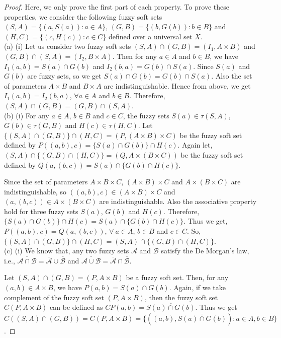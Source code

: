 \documentclass{article}
\theoremstyle{definition}
\begin{document}
\begin{proof}

 Here, we only prove the first part of each property. To prove these properties, we consider the following fuzzy soft sets $(S,A)=\{(a, S(a)): a\in A\}$, $(G,B)=\{(b, G(b)): b\in B\}$ and  $(H,C)=\{(c, H(c)): c\in C\}$ defined over a universal set $X$.\\

(a) (i) Let us consider two fuzzy soft sets $(S,A) \cap (G,B)=(I_1, A\times B)$ and $(G,B) \cap (S,A)=(I_2, B\times A)$. Then for any $a\in A$ and $b\in B$, we have $I_1(a,b)=S(a) \cap G(b)$ and $I_2(b,a)=G(b) \cap S(a)$. Since $S(a)$ and $G(b)$ are fuzzy sets, so we get $S(a) \cap G(b)=G(b) \cap S(a)$. Also the set of parameters $A\times B$ and $B\times A$ are indistinguishable. Hence from above, we get $I_1(a,b)= I_2(b,a)$, $\forall a \in A $ and $b\in B$. Therefore, $(S,A) \cap (G,B) = (G,B) \cap (S,A)$.\\


(b) (i) For any $a\in A$, $b\in B$ and $c\in C$, the fuzzy sets $S(a)\in \tau (S,A)$, $G(b)\in \tau (G,B)$ and $H(c)\in \tau (H,C)$. Let $\{(S,A) \cap (G,B)\}\cap (H,C)= (P, (A\times B)\times C)$ be the fuzzy soft set defined by $P((a,b),c)= \{S(a)\cap G(b)\}\cap H(c)$. Again let, $(S,A) \cap \{(G,B)\cap (H,C)\}= (Q, A\times (B\times C))$ be the fuzzy soft set defined by $Q(a,(b,c))= S(a)\cap \{G(b)\cap H(c)\}$.

Since the set of parameters $A\times B \times C$,  $(A\times B) \times C$ and $A\times (B \times C)$ are indistinguishable, so $((a,b),c)\in (A\times B)\times C$ and $(a,(b,c)) \in A\times(B\times C)$ are indistinguishable. Also the associative property hold for three fuzzy sets $S(a)$, $G(b)$ and $H(c)$. Therefore, $\{S(a)\cap G(b)\}\cap H(c)=S(a)\cap \{G(b)\cap H(c)\}$. Thus we get, $  P((a,b),c)= Q(a,(b,c))$, $\forall ~a\in A$, $b\in B$ and $c\in C$. So,  $\{(S,A) \cap (G,B)\}\cap (H,C) = (S,A) \cap \{(G,B)\cap (H,C)\}$.\\

(c) (i) We know that, any two fuzzy sets $\mathcal{A}$ and $\mathcal{B}$ satisfy the De Morgan's law, i.e., $\overline{\mathcal{A} \cap  \mathcal{B}} = \overline{\mathcal{A}}\cup \overline{\mathcal{B}}$ and $\overline{\mathcal{A} \cup  \mathcal{B}} = \overline{\mathcal{A}}\cap \overline{\mathcal{B}}$.

Let $(S,A) \cap (G,B)=(P,A\times B)$ be a fuzzy soft set. Then, for any $(a,b)\in A\times B$, we have $P(a,b)=S(a)\cap G(b)$. Again, if we take complement of the fuzzy soft set $(P,A\times B)$, then the fuzzy soft set $C(P,A\times B)$ can be defined as $CP(a,b)=\overline{S(a)\cap G(b)}$. Thus we get $ C((S,A) \cap (G,B))=C(P,A\times B)=\{((a, b), \overline{S(a)\cap G(b)}): a\in A, b\in B\}$.



\end{proof}
\end{document}
